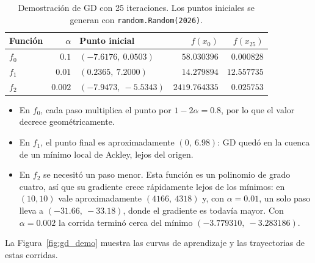 \begin{table}[H]
\centering
\begin{tabular}{lrlrr}
\toprule
Función & $\alpha$ & Punto inicial & $f(x_0)$ & $f(x_{25})$ \\
\midrule
$f_0$ & $0.1$   & $(-7.6176,\ 0.0503)$  & $58.030396$   & $0.000828$ \\
$f_1$ & $0.01$  & $(0.2365,\ 7.2000)$   & $14.279894$   & $12.557735$ \\
$f_2$ & $0.002$ & $(-7.9473,\ -5.5343)$ & $2419.764335$ & $0.025753$ \\
\bottomrule
\end{tabular}
\caption{Demostración de GD con 25 iteraciones. Los puntos iniciales se
generan con \texttt{random.Random(2026)}.}
\label{tab:gd_demo}
\end{table}

\begin{itemize}
    \item En $f_0$, cada paso multiplica el punto por $1-2\alpha=0.8$, por
    lo que el valor decrece geométricamente.
    \item En $f_1$, el punto final es aproximadamente $(0,\ 6.98)$: GD quedó
    en la cuenca de un mínimo local de Ackley, lejos del origen.
    \item En $f_2$ se necesitó un paso menor. Esta función es un polinomio
    de grado cuatro, así que su gradiente crece rápidamente lejos de los
    mínimos: en $(10,10)$ vale aproximadamente $(4166,\ 4318)$ y, con
    $\alpha=0.01$, un solo paso lleva a $(-31.66,\ -33.18)$, donde el
    gradiente es todavía mayor. Con $\alpha=0.002$ la corrida terminó cerca
    del mínimo $(-3.779310,\ -3.283186)$.
\end{itemize}

La Figura~\ref{fig:gd_demo} muestra las curvas de aprendizaje y las
trayectorias de estas corridas.


